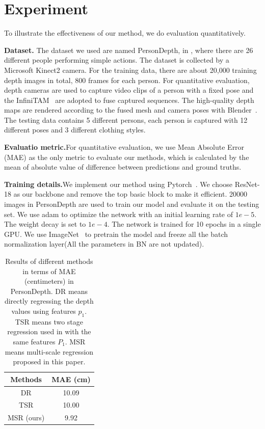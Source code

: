 \documentclass{article} %
\begin{document}
\section{Experiment}\label{exp}
To illustrate the effectiveness of our method, we do evaluation quantitatively.

\textbf{Dataset.} The dataset we used are named PersonDepth, in \cite{tang2019neural}, where there are 26 different people performing simple actions. The dataset is collected by a Microsoft Kinect2 camera. For the training data, there are about 20,000 training depth images in total, 800 frames for each person. For quantitative evaluation, depth cameras are used to capture video clips of a person with a fixed pose and the InfiniTAM~\cite{kahler2015very} are adopted to fuse captured sequences. The high-quality depth maps are rendered according to the fused mesh and camera poses with Blender~\cite{blender2014blender}. The testing data contains 5 different persons, each person is captured with 12 different poses and 3 different clothing styles.

\textbf{Evaluatio metric.}For quantitative evaluation, we use Mean Absolute Error (MAE) as the only metric to evaluate our methods, which is calculated by the mean of absolute value of difference between predictions and ground truths.

\textbf{Training details.}We implement our method using Pytorch~\cite{paszke2019pytorch}. We choose ResNet-18 as our backbone and remove the top basic block to make it efficient. 20000 images in PersonDepth are used to train our model and evaluate it on the testing set. We use adam to optimize the network with an initial learning rate of $1e-5$.  The weight decay is set to $1e-4$. The network is trained for 10 epochs in a single GPU. We use ImageNet~\cite{deng2009imagenet} to pretrain the model and freeze all the batch normalization layer(All the parameters in BN are not updated).

\begin{table}[]
    \centering
    \begin{tabular}{c|c}
    \hline
        Methods & MAE (cm) \\
    \hline
        DR & 10.09 \\
    \hline
        TSR & 10.00 \\
    \hline
        MSR (ours) & 9.92 \\
    \hline
    \end{tabular}
    \caption{Results of different methods in terms of MAE (centimeters) in PersonDepth. DR means directly regressing the depth values using features $p_1$. TSR means two stage regression used in \cite{tang2019neural} with the same features $P_1$. MSR means multi-scale regression proposed in this paper.}
    \label{table1}
\end{table}
\end{document}
